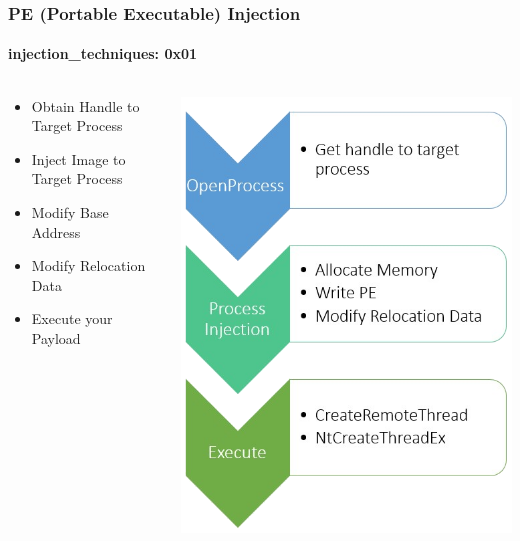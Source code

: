 \documentclass[aspectratio=169]{beamer}
\begin{document}
\begin{frame}
  \frametitle{PE (Portable Executable) Injection}
  \framesubtitle{injection\_techniques: 0x01}
  \begin{columns}
    \begin{column}{.5\textwidth}
      \begin{itemize}
      \item{Obtain Handle to Target Process}
      \item{Inject Image to Target Process}
      \item{Modify Base Address}
      \item{Modify Relocation Data}
      \item{Execute your Payload}
      \end{itemize}
    \end{column}
    \hfill
    \begin{column}{.5\textwidth}
      \begin{center}
        \includegraphics[scale=0.4]{pe-injection}
      \end{center}
    \end{column}
  \end{columns}
\end{frame}
\end{document}
